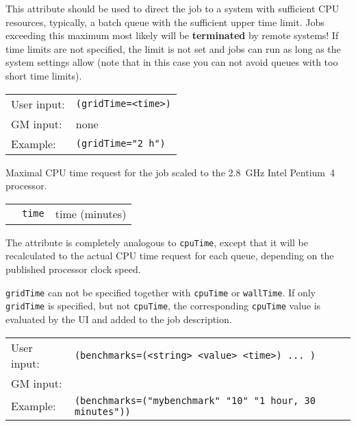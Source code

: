  \begin{framed}
    This attribute should be used to direct the job to a system with
    sufficient CPU resources, typically, a batch queue with the
    sufficient upper time limit. Jobs exceeding this maximum most
    likely will be \textbf{terminated} by remote systems! If 
    time limits are not specified, the limit is not set and jobs
    can run as long as the system settings allow (note that in this
    case you can not avoid queues with too short time limits).
  \end{framed}

  \hspace*{0.5cm}
  \begin{shaded}
  \end{shaded}
  \begin{tabular}{lp{13cm}}
    User input:&\verb#(gridTime=<time>)#\\
    GM input:& none\\
    Example:&\verb#(gridTime="2 h")#\\
  \end{tabular}

  Maximal CPU time request for the job scaled to the 2.8~GHz
  Intel\textsuperscript{\textregistered}
  Pentium\textsuperscript{\textregistered}~4 processor.

  \begin{tabular}{llp{10cm}}
    \hspace*{1cm}&\texttt{time} & time (minutes)\\
  \end{tabular}
  
  The attribute is completely analogous to \texttt{cpuTime}, except
  that it will be recalculated to the actual CPU time request for each
  queue, depending on the published processor clock speed.
  
  \texttt{gridTime} can not be specified together with \texttt{cpuTime}
  or \texttt{wallTime}. If only \texttt{gridTime} is specified, but not \texttt{cpuTime},
  the corresponding  \texttt{cpuTime} value is evaluated by the UI and added to the job description.

  \hspace*{0.5cm}
  \begin{shaded}
  \end{shaded}
  \begin{tabular}{lp{13cm}}
    User input:&\verb#(benchmarks=(<string> <value> <time>) ... )#\\
    GM input:&\\
    Example:&\verb#(benchmarks=("mybenchmark" "10" "1 hour, 30 minutes"))#\\
  \end{tabular}

